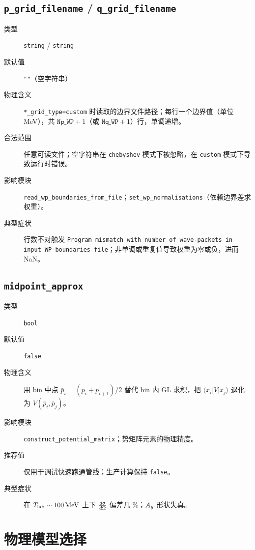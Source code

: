\subsection{\texttt{p\_grid\_filename} / \texttt{q\_grid\_filename}}

\begin{description}
  \item[类型] \texttt{string} / \texttt{string}
  \item[默认值] \texttt{""}（空字符串）
  \item[物理含义] \texttt{*\_grid\_type=custom} 时读取的边界文件路径；每行一个边界值（单位 \si{MeV}），共 \(\texttt{Np\_WP}+1\)（或 \(\texttt{Nq\_WP}+1\)）行，单调递增。
  \item[合法范围] 任意可读文件；空字符串在 \texttt{chebyshev} 模式下被忽略，在 \texttt{custom} 模式下导致运行时错误。
  \item[影响模块] \texttt{read\_wp\_boundaries\_from\_file}；\texttt{set\_wp\_normalisations}（依赖边界差求权重）。
  \item[典型症状] 行数不对触发 \texttt{Program mismatch with number of wave-packets in input WP-boundaries file}；非单调或重复值导致权重为零或负，进而 NaN。
\end{description}

\subsection{\texttt{midpoint\_approx}}

\begin{description}
  \item[类型] \texttt{bool}
  \item[默认值] \texttt{false}
  \item[物理含义] 用 bin 中点 \(\bar p_i = (p_i + p_{i+1})/2\) 替代 bin 内 GL 求积，把 \(\langle x_i|V|x_j\rangle\) 退化为 \(V(\bar p_i,\bar p_j)\)。
  \item[影响模块] \texttt{construct\_potential\_matrix}；势矩阵元素的物理精度。
  \item[推荐值] 仅用于调试快速跑通管线；生产计算保持 \texttt{false}。
  \item[典型症状] 在 \({T_{\text{lab}}}\sim 100\,\mathrm{MeV}\) 上下 \(\frac{d\sigma}{d\Omega}\) 偏差几 \%；\(A_y\) 形状失真。
\end{description}

\section{物理模型选择}
\label{sec:appE_models}

